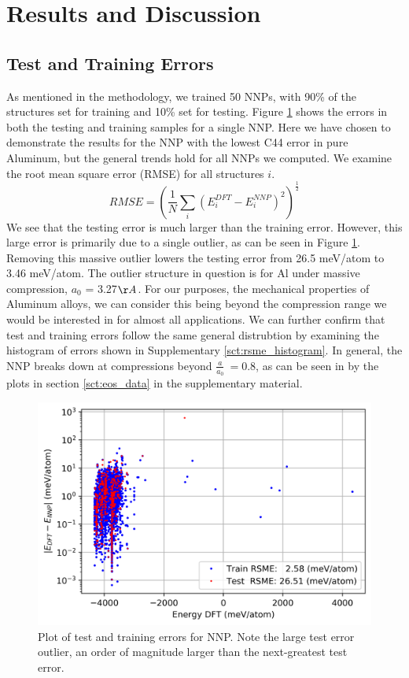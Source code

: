 \documentclass{article}
\begin{document}
\section{Results and Discussion}

\subsection{Test and Training Errors} \label{sct:test_and_train_errors}

As mentioned in the methodology, we trained 50 NNPs, with 90\% of the structures set for training and 10\% set for testing.
Figure \ref{fig:rsme_plot} shows the errors in both the testing and training samples for a single NNP.
Here we have chosen to demonstrate the results for the NNP with the lowest C44 error in pure Aluminum, but the general trends hold for all NNPs we computed. We examine the root mean square error (RMSE) for all structures $i$.
\begin{equation}
    RMSE = (\frac{1}{N}\sum_i (E^{DFT}_i - E^{NNP}_i)^2)^\frac{1}{2}
\end{equation}
We see that the testing error is much larger than the training error.
However, this large error is primarily due to a single outlier, as can be seen in  Figure \ref{fig:rsme_plot}.
Removing this massive outlier lowers the testing error from 26.5 meV/atom to 3.46 meV/atom.
The outlier structure in question is for Al under massive compression, $a_0$ = 3.27$\AA$.
For our purposes, the mechanical properties of Aluminum alloys, we can consider this being beyond the compression range we would be interested in for almost all applications.
We can further confirm that test and training errors follow the same general distrubtion by examining the histogram of errors shown in Supplementary \ref{sct:rsme_histogram}. 
In general, the NNP breaks down at compressions beyond $\frac{a}{a_0} ~= 0.8$, as can be seen in by the plots in section \ref{sct:eos_data} in the supplementary material. 

\begin{figure}[H]%
\centering%
\includegraphics[width=1.0\textwidth,center]{figures/plot_nnperrors.png}%
\caption{Plot of test and training errors for NNP.
Note the large test error outlier, an order of magnitude larger than the next-greatest test error. }%
\label{fig:rsme_plot}
\end{figure}
\end{document}
